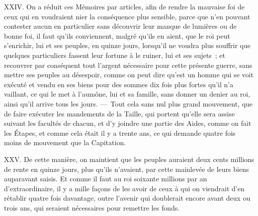 \documentclass[french,twoside]{book} %
\begin{document}
XXIV. On a réduit ces Mémoires par articles, afin de rendre la mauvaise foi de ceux qui en voudraient nier la conséquence plus sensible, parce que n’en pouvant contester aucun en particulier sans découvrir leur manque de lumières ou de bonne foi, il faut qu’ils conviennent, malgré qu’ils en aient, que le roi peut s’enrichir, lui et ses peuples, en quinze jours, lorsqu’il ne voudra plus souffrir que quelques particuliers fassent leur fortune à le ruiner, lui et ses sujets ; et recouvrer par conséquent tout l’argent nécessaire pour cette présente guerre, sans mettre ses peuples au désespoir, comme on peut dire qu’est un homme qui se voit exécuté et vendu en ses biens pour des sommes dix fois plus fortes qu’il n’a vaillant, ce qui le met à l’aumône, lui et sa famille, sans donner un denier au roi, ainsi qu’il arrive tous les jours. — Tout cela sans nul plus grand mouvement, que de faire exécuter les mandements de la Taille, qui portent qu’elle sera assise suivant les facultés de chacun, et d’y joindre une partie des Aides, comme on fait les Étapes, et comme cela était il y a trente ans, ce qui demande quatre fois moins de mouvement que la Capitation.\par
XXV. De cette manière, on maintient que les peuples auraient deux cents millions de rente en quinze jours, plus qu’ils n’avaient, par cette mainlevée de leurs biens auparavant saisis. Et comme il faut au roi soixante millions par an d’extraordinaire, il y a mille façons de les avoir de ceux à qui on viendrait d’en rétablir quatre fois davantage, outre l’avenir qui doublerait encore avant deux ou trois ans, qui seraient nécessaires pour remettre les fonds.
\end{document}
